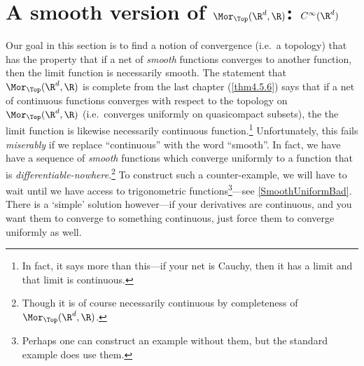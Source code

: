 \section{A smooth version of \texorpdfstring{$\Mor _{\Top}(\R ^d,\R )$}{Mor Top(Rd,R)}:  \texorpdfstring{$C^{\infty}(\R ^d)$}{Cinfty (Rd)}}

Our goal in this section is to find a notion of convergence (i.e.~a topology) that has the property that if a net of \emph{smooth} functions converges to another  function, then the limit function is necessarily smooth.  The statement that $\Mor _{\Top}(\R ^d,\R )$ is complete from the last chapter (\cref{thm4.5.6}) says that if a net of continuous functions converges with respect to the topology on $\Mor _{\Top}(\R ^d,\R )$ (i.e.~converges uniformly on quasicompact subsets), the the limit function is likewise necessarily continuous function.\footnote{In fact, it says more than this---if your net is Cauchy, then it has a limit and that limit is continuous.}  Unfortunately, this fails \emph{miserably} if we replace ``continuous'' with the word ``smooth''.  In fact, we have have a sequence of \emph{smooth} functions which converge uniformly to a function that is \emph{differentiable-nowhere}.\footnote{Though it is of course necessarily continuous by completeness of $\Mor _{\Top}(\R ^d,\R )$.}  To construct such a counter-example, we will have to wait until we have access to trigonometric functions\footnote{Perhaps one can construct an example without them, but the standard example does use them.}---see \cref{SmoothUniformBad}.  There is a `simple' solution however---if your derivatives are continuous, and you want them to converge to something continuous, just force them to converge uniformly as well.
